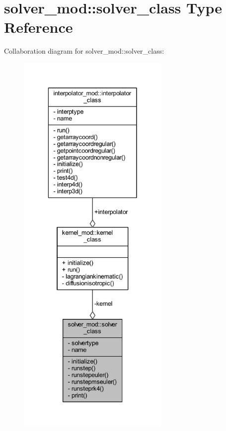 \hypertarget{structsolver__mod_1_1solver__class}{}\section{solver\+\_\+mod\+:\+:solver\+\_\+class Type Reference}
\label{structsolver__mod_1_1solver__class}


Collaboration diagram for solver\+\_\+mod\+:\+:solver\+\_\+class\+:\nopagebreak
\begin{figure}[H]
\begin{center}
\leavevmode
\includegraphics[height=550pt]{structsolver__mod_1_1solver__class__coll__graph}
\end{center}
\end{figure}
